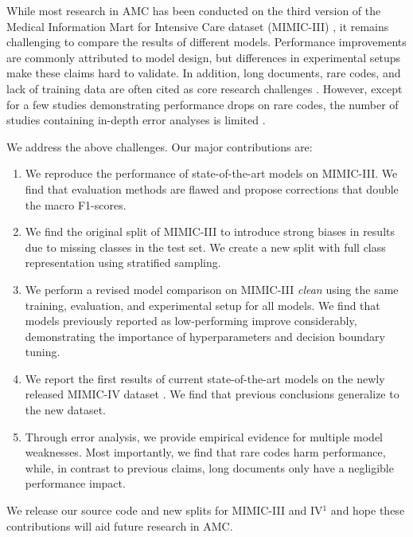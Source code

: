 {While most research in AMC has been conducted on the third version of the Medical Information Mart for Intensive Care dataset (MIMIC-III) \parencite{tengReviewDeepNeural2022, venkateshAutomatingOverburdenedClinical2023}, it remains challenging to compare the results of different models. Performance improvements are commonly attributed to model design, but differences in experimental setups make these claims hard to validate.
In addition, long documents, rare codes, and lack of training data are often cited as core research challenges \parencite{baoMedicalCodePrediction2021,dongAutomatedClinicalCoding2022,dongExplainableAutomatedCoding2021,feuchtDescriptionbasedLabelAttention2021,gaoLimitationsTransformersClinical2021,huangPLMICDAutomaticICD2022,jiDoesMagicBERT2021,jiUnifiedReviewDeep2022,kavuluruEmpiricalEvaluationSupervised2015,kimReadAttendCode2021,liICDCodingClinical2020,liuEffectiveConvolutionalAttention2021,michalopoulosICDBigBirdContextualEmbedding2022,moonsComparisonDeepLearning2020,pascualBERTbasedAutomaticICD2021,tengReviewDeepNeural2022,tengExplainablePredictionMedical2020,xieEHRCodingMultiscale2019,yangKnowledgeInjectedPrompt2022,zhangBERTXMLLargeScale2020,zhouAutomaticICDCoding2021, vuLabelAttentionModel2020, venkateshAutomatingOverburdenedClinical2023}. However, except for a few studies demonstrating performance drops on rare codes, the number of studies containing in-depth error analyses is limited \parencite{baoMedicalCodePrediction2021,dongExplainableAutomatedCoding2021,jiDoesMagicBERT2021}.

We address the above challenges. Our major contributions are:
\begin{enumerate}
    \item We reproduce the performance of state-of-the-art models on MIMIC-III. We find that evaluation methods are flawed and propose corrections that double the macro F1-scores.
    \item We find the original split of MIMIC-III to introduce strong biases in results due to missing classes in the test set. We create a new split with full class representation using stratified sampling.
    \item We perform a revised model comparison on MIMIC-III \textit{clean} using the same training, evaluation, and experimental setup for all models. We find that models previously reported as low-performing improve considerably, demonstrating the importance of hyperparameters and decision boundary tuning.
    \item We report the first results of current state-of-the-art models on the newly released MIMIC-IV dataset \parencite{johnsonMIMICIVFreelyAccessible2023, goldbergerPhysioBankPhysioToolkitPhysioNet2000}. We find that previous conclusions generalize to the new dataset.
    \item Through error analysis, we provide empirical evidence for multiple model weaknesses. Most importantly, we find that rare codes harm performance, while, in contrast to previous claims, long documents only have a negligible performance impact.
\end{enumerate}
We release our source code and new splits for MIMIC-III and IV$^\text{1}$
and hope these contributions will aid future research in AMC.


}
